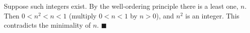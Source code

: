 Suppose such integers exist. By the well-ordering principle there is a least one, $n$. Then $0<n^2<n<1$ (multiply $0<n<1$ by $n>0$), and $n^2$ is an integer. This contradicts the minimality of $n$. $\blacksquare$
